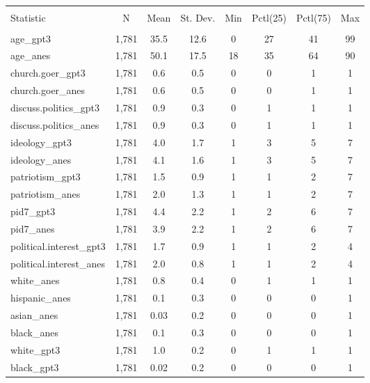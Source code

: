 
\begin{table}[!htbp] \centering 
  \caption{} 
  \label{} 
\begin{tabular}{@{\extracolsep{5pt}}lccccccc} 
\\[-1.8ex]\hline \\[-1.8ex] 
Statistic & \multicolumn{1}{c}{N} & \multicolumn{1}{c}{Mean} & \multicolumn{1}{c}{St. Dev.} & \multicolumn{1}{c}{Min} & \multicolumn{1}{c}{Pctl(25)} & \multicolumn{1}{c}{Pctl(75)} & \multicolumn{1}{c}{Max} \\ 
\hline \\[-1.8ex] 
age\_gpt3 & 1,781 & 35.5 & 12.6 & 0 & 27 & 41 & 99 \\ 
age\_anes & 1,781 & 50.1 & 17.5 & 18 & 35 & 64 & 90 \\ 
church.goer\_gpt3 & 1,781 & 0.6 & 0.5 & 0 & 0 & 1 & 1 \\ 
church.goer\_anes & 1,781 & 0.6 & 0.5 & 0 & 0 & 1 & 1 \\ 
discuss.politics\_gpt3 & 1,781 & 0.9 & 0.3 & 0 & 1 & 1 & 1 \\ 
discuss.politics\_anes & 1,781 & 0.9 & 0.3 & 0 & 1 & 1 & 1 \\ 
ideology\_gpt3 & 1,781 & 4.0 & 1.7 & 1 & 3 & 5 & 7 \\ 
ideology\_anes & 1,781 & 4.1 & 1.6 & 1 & 3 & 5 & 7 \\ 
patriotism\_gpt3 & 1,781 & 1.5 & 0.9 & 1 & 1 & 2 & 7 \\ 
patriotism\_anes & 1,781 & 2.0 & 1.3 & 1 & 1 & 2 & 7 \\ 
pid7\_gpt3 & 1,781 & 4.4 & 2.2 & 1 & 2 & 6 & 7 \\ 
pid7\_anes & 1,781 & 3.9 & 2.2 & 1 & 2 & 6 & 7 \\ 
political.interest\_gpt3 & 1,781 & 1.7 & 0.9 & 1 & 1 & 2 & 4 \\ 
political.interest\_anes & 1,781 & 2.0 & 0.8 & 1 & 1 & 2 & 4 \\ 
white\_anes & 1,781 & 0.8 & 0.4 & 0 & 1 & 1 & 1 \\ 
hispanic\_anes & 1,781 & 0.1 & 0.3 & 0 & 0 & 0 & 1 \\ 
asian\_anes & 1,781 & 0.03 & 0.2 & 0 & 0 & 0 & 1 \\ 
black\_anes & 1,781 & 0.1 & 0.3 & 0 & 0 & 0 & 1 \\ 
white\_gpt3 & 1,781 & 1.0 & 0.2 & 0 & 1 & 1 & 1 \\ 
black\_gpt3 & 1,781 & 0.02 & 0.2 & 0 & 0 & 0 & 1 \\ 

\end{tabular}
\end{table}
